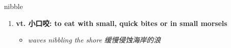 
\begin{frame}
{\huge nibble}
\begin{center}
\begin{enumerate}\Large
  \item \textbf{vt. 小口咬: to eat with small, quick bites or in small morsels}
  \begin{itemize}
    \item \em{\Large{waves nibbling the shore 缓慢侵蚀海岸的浪}}
  \end{itemize}
\end{enumerate}
\end{center}
\end{frame}
